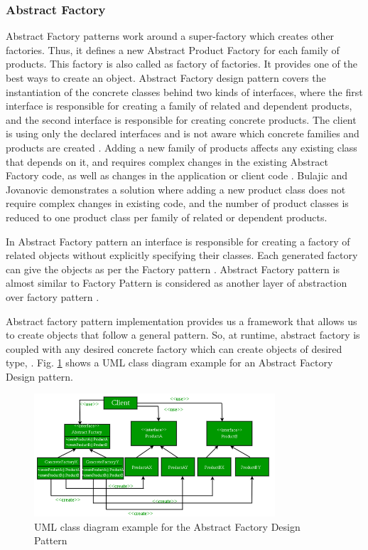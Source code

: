 \documentclass[sigplan,12pt,nonacm=true,review=false]{acmart}
\begin{document}
\subsubsection{Abstract Factory}
Abstract Factory patterns work around a super-factory which creates other factories. Thus, it defines a new Abstract Product Factory for each family of products. This factory is also called as factory of factories. It provides one of the best ways to create an object. Abstract Factory design pattern covers the instantiation of the concrete classes behind two kinds of interfaces, where the first interface is responsible for creating a family of related and dependent products, and the second interface is responsible for creating concrete products. The client is using only the declared interfaces and is not aware which concrete families and products are created \cite{bulajic_approach_2012}. Adding a new family of products affects any existing class that depends on it, and requires complex changes in the existing Abstract Factory code, as well as changes in the application or client code \cite{bulajic_approach_2012}. Bulajic and Jovanovic \cite{bulajic_approach_2012}  demonstrates a solution where adding a new product class does not require complex changes in existing code, and the number of product classes is reduced to one product class per family of related or dependent products.

In Abstract Factory pattern an interface is responsible for creating a factory of related objects without explicitly specifying their classes. Each generated factory can give the objects as per the Factory pattern \cite{noauthor_design_nodate-1}. Abstract Factory pattern is almost similar to Factory Pattern is considered as another layer of abstraction over factory pattern \cite{noauthor_abstract_2017}. 

Abstract factory pattern implementation provides us a framework that allows us to create objects that follow a general pattern. So, at runtime, abstract factory is coupled with any desired concrete factory which can create objects of desired type, \cite{noauthor_abstract_nodate-1}. Fig. \ref{fig:uml1} shows a UML class diagram example for an Abstract Factory Design pattern.

\begin{figure}[tb]
  \includegraphics[width=0.8\textwidth]{eolang/tr-02/assets/Picture1.png}
  \caption{UML class diagram example for the Abstract Factory Design Pattern}
  \label{fig:uml1}
\end{figure}
\end{document}

